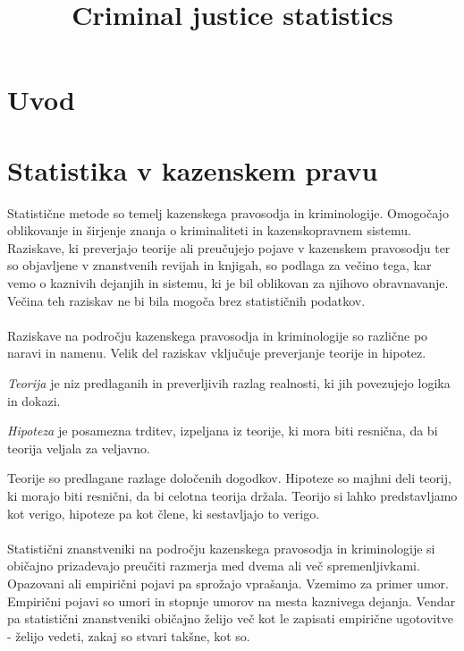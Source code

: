 \documentclass[mat1, tisk]{fmfdelo}
\title{Criminal justice statistics}
\theoremstyle{definition} %
\theoremstyle{trditev} %
\theoremstyle{izrek}
\begin{document}
\section{Uvod}

\section{Statistika v kazenskem pravu}
Statistične metode so temelj kazenskega pravosodja in kriminologije. Omogočajo oblikovanje in širjenje znanja o kriminaliteti in kazenskopravnem 
sistemu. Raziskave, ki preverjajo teorije ali preučujejo pojave v kazenskem pravosodju ter so objavljene v znanstvenih revijah in knjigah, so 
podlaga za večino tega, kar vemo o kaznivih dejanjih in sistemu, ki je bil oblikovan za njihovo obravnavanje. Večina teh raziskav ne bi bila mogoča 
brez statističnih podatkov.\\\\
Raziskave na področju kazenskega pravosodja in kriminologije so različne po naravi in namenu. Velik del raziskav vključuje preverjanje teorije 
in hipotez. 
\begin{definicija}
    \textit{Teorija} je niz predlaganih in preverljivih razlag realnosti, ki jih povezujejo logika in dokazi.
\end{definicija}
\begin{definicija}
    \textit{Hipoteza} je posamezna trditev, izpeljana iz teorije, ki mora biti resnična, da bi teorija veljala za veljavno.
\end{definicija}
Teorije so predlagane razlage določenih dogodkov. Hipoteze so majhni deli teorij, ki morajo biti resnični, da bi celotna teorija držala. Teorijo 
si lahko predstavljamo kot verigo, hipoteze pa kot člene, ki sestavljajo to verigo.\\\\
Statistični znanstveniki na področju kazenskega pravosodja in kriminologije si običajno prizadevajo preučiti razmerja med dvema ali več spremenljivkami. 
Opazovani ali empirični pojavi pa sprožajo vprašanja. Vzemimo za primer umor. Empirični pojavi so umori in stopnje umorov na mesta kaznivega 
dejanja. Vendar pa statistični znanstveniki običajno želijo več kot le zapisati empirične ugotovitve - želijo vedeti, zakaj so stvari takšne, kot so. 
\end{document}
